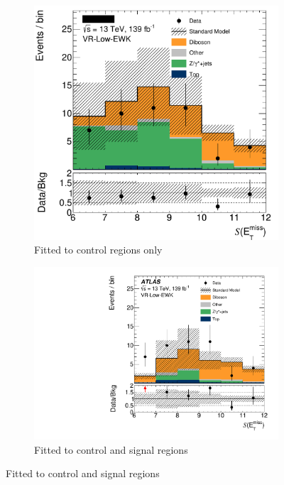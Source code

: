 \begin{figure}[tp]
\centering
\begin{subfigure}{0.48\textwidth}
\centering
\includegraphics[width=\textwidth]{figures/2ljets_prefit_VR_Low_EWK_met_Sign_no_sr.png}
\caption{Fitted to control regions only}
\end{subfigure}
\hfill
\begin{subfigure}{0.48\textwidth}
\centering
\includegraphics[width=\textwidth]{figures/2ljets_postfit_VR_Low_EWK_met_Sign.pdf}
\caption{Fitted to control and signal regions}

\end{subfigure}
\end{figure}
